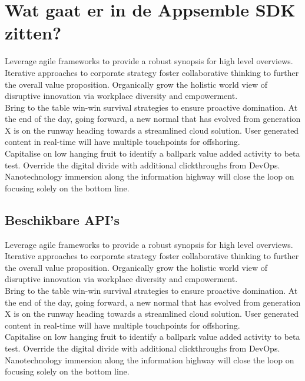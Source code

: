 \chapter{Wat gaat er in de Appsemble SDK zitten?}

Leverage agile frameworks to provide a robust synopsis for high level overviews. Iterative approaches to corporate strategy foster collaborative thinking to further the overall value proposition. Organically grow the holistic world view of disruptive innovation via workplace diversity and empowerment.\\

Bring to the table win-win survival strategies to ensure proactive domination. At the end of the day, going forward, a new normal that has evolved from generation X is on the runway heading towards a streamlined cloud solution. User generated content in real-time will have multiple touchpoints for offshoring. \\

Capitalise on low hanging fruit to identify a ballpark value added activity to beta test. Override the digital divide with additional clickthroughs from DevOps. Nanotechnology immersion along the information highway will close the loop on focusing solely on the bottom line. 

\section{Beschikbare API's}

Leverage agile frameworks to provide a robust synopsis for high level overviews. Iterative approaches to corporate strategy foster collaborative thinking to further the overall value proposition. Organically grow the holistic world view of disruptive innovation via workplace diversity and empowerment.\\

Bring to the table win-win survival strategies to ensure proactive domination. At the end of the day, going forward, a new normal that has evolved from generation X is on the runway heading towards a streamlined cloud solution. User generated content in real-time will have multiple touchpoints for offshoring. \\

Capitalise on low hanging fruit to identify a ballpark value added activity to beta test. Override the digital divide with additional clickthroughs from DevOps. Nanotechnology immersion along the information highway will close the loop on focusing solely on the bottom line. 
